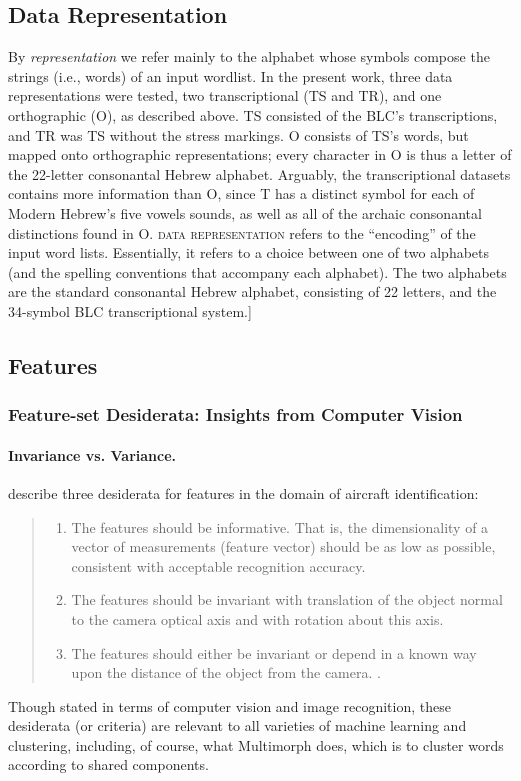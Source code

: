 \subsection {Data Representation} 
\label{sec:datarep}
By \emph{representation} we refer mainly to the alphabet whose 
symbols compose the strings (i.e., words) 
of an input wordlist.
In the present work, three data representations were tested, two transcriptional 
(TS and TR), and one orthographic (O), as described above.
TS consisted of the BLC's transcriptions, and TR was TS without the stress markings. 
O consists of TS's words, but mapped onto orthographic 
representations; every character in O is thus
a letter of the 22-letter consonantal Hebrew alphabet.
Arguably, the transcriptional datasets contains more information than O,
since T has a distinct symbol for each of Modern Hebrew's five vowels sounds,
as well as all of the archaic consonantal distinctions found in O. 
\textsc{data representation} refers to the ``encoding'' of the input
word lists. Essentially, it refers to a choice between one of two alphabets (and the spelling conventions that 
accompany each alphabet). The two alphabets are the standard consonantal Hebrew alphabet, consisting of 22 letters,
and the 34-symbol BLC transcriptional system.]

\subsection{Features}   %
\label{sec:features}

\subsubsection{Feature-set Desiderata: Insights from Computer Vision}
\paragraph{Invariance vs. Variance.}
\cite{dudani-et-al:1977} describe three desiderata for features in the 
domain of aircraft identification:
\begin{quote}
\begin{enumerate}
\item The features should be informative. That is, the dimensionality of a 
vector of measurements (feature vector) should be as low as possible, 
consistent with acceptable recognition accuracy.
\item The features should be invariant with translation of the object 
normal to the camera optical axis and with rotation about this axis.
\item The features should either be invariant or depend in a known 
way upon the distance of the object from the camera.
\citep[][p. 40]{dudani-et-al:1977}.
\end{enumerate}
\end{quote}
Though stated in terms of computer vision and image recognition, 
these desiderata (or criteria) are relevant to all varieties of machine 
learning and clustering, including, of course, what Multimorph does, which is to
cluster words according to shared components.

